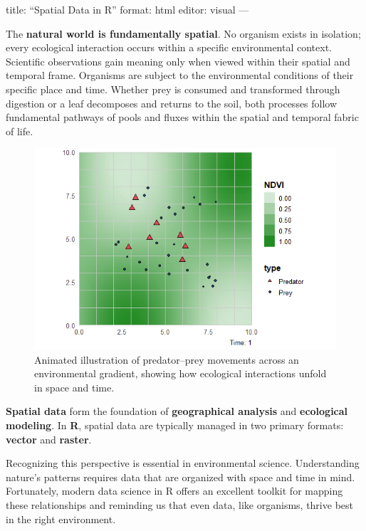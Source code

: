 \documentclass[
]{book}
\author{}
\date{}
\renewcommand*\contentsname{Table of contents}
\newcommand\contentsname{Table of contents}
\begin{document}
\frontmatter

\renewcommand*\contentsname{Table of contents}
{
\setcounter{tocdepth}{2}
\tableofcontents
}

\mainmatter
title: ``Spatial Data in R'' format: html editor: visual ---

The \textbf{natural world is fundamentally spatial}. No organism exists
in isolation; every ecological interaction occurs within a specific
environmental context. Scientific observations gain meaning only when
viewed within their spatial and temporal frame. Organisms are subject to
the environmental conditions of their specific place and time. Whether
prey is consumed and transformed through digestion or a leaf decomposes
and returns to the soil, both processes follow fundamental pathways of
pools and fluxes within the spatial and temporal fabric of life.

\begin{figure}[H]

{\centering \includegraphics[width=5.20833in,height=\textheight,keepaspectratio]{images/predator_prey_spatial.gif}

}

\caption{Animated illustration of predator--prey movements across an
environmental gradient, showing how ecological interactions unfold in
space and time.}

\end{figure}%

\textbf{Spatial data} form the foundation of \textbf{geographical
analysis} and \textbf{ecological modeling}. In \textbf{R}, spatial data
are typically managed in two primary formats: \textbf{vector} and
\textbf{raster}.

Recognizing this perspective is essential in environmental science.
Understanding nature's patterns requires data that are organized with
space and time in mind. Fortunately, modern data science in R offers an
excellent toolkit for mapping these relationships and reminding us that
even data, like organisms, thrive best in the right environment.
\end{document}
